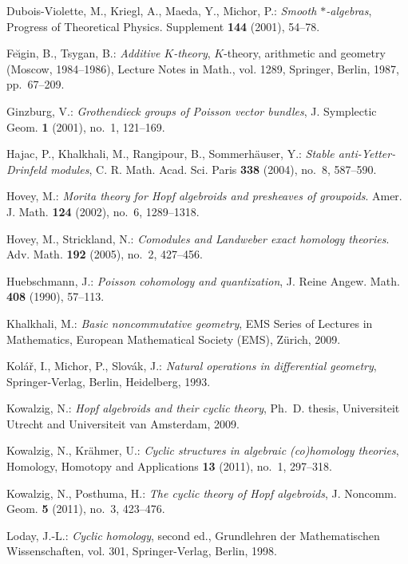\documentclass[reqno, a4paper, 10pt]{amsart}
\numberwithin{equation}{section}
\theoremstyle{plain}
\theoremstyle{definition}
\theoremstyle{remark}
\begin{document}
\begin{thebibliography}{10}
Dubois-Violette, M., Kriegl, A., Maeda, Y., Michor, P.: \emph{Smooth $*$-algebras},  Progress of Theoretical Physics. Supplement  \textbf{144} (2001), 54--78.

Fe{\u\i}gin, B., Tsygan, B.: \emph{Additive {$K$}-theory},
  $K$-theory, arithmetic and geometry (Moscow, 1984--1986), Lecture Notes in
  Math., vol. 1289, Springer, Berlin, 1987, pp.~67--209.

Ginzburg, V.: \emph{Grothendieck groups of {P}oisson vector bundles}, J.
  Symplectic Geom. \textbf{1} (2001), no.~1, 121--169.

Hajac, P., Khalkhali, M., Rangipour, B., Sommerh{\"a}user, Y.: 
\emph{Stable anti-{Y}etter-{D}rinfeld modules}, C. R. Math. Acad. Sci.
  Paris \textbf{338} (2004), no.~8, 587--590.

Hovey, M.: \emph{Morita theory for Hopf algebroids and presheaves of groupoids}. Amer. J. Math. \textbf{124} (2002), no.~6, 1289--1318.

Hovey, M., Strickland, N.: \emph{Comodules and Landweber exact homology theories}. Adv. Math. \textbf{192} (2005), no.~2, 427--456.

Huebschmann, J.: \emph{Poisson cohomology and quantization}, J. Reine
  Angew. Math. \textbf{408} (1990), 57--113.

Khalkhali, M.: \emph{Basic noncommutative geometry}, EMS Series of Lectures
  in Mathematics, European Mathematical Society (EMS), Z\"urich, 2009.

Kol\'a\v{r}, I., Michor, P., Slov\'ak, J.: \emph{Natural operations in differential geometry}, Springer-Verlag, Berlin, Heidelberg, 1993.

Kowalzig, N.: \emph{Hopf algebroids and their cyclic theory}, Ph.~D. thesis,
  Universiteit Utrecht and Universiteit van Amsterdam, 2009.

Kowalzig, N., Kr{\"a}hmer, U.: \emph{Cyclic structures in algebraic
  (co)homology theories}, Homology, Homotopy and Applications {\bf 13}
  (2011), no.~1, 297--318.

Kowalzig, N., Posthuma, H.: \emph{The cyclic theory of {H}opf
  algebroids},  J. Noncomm. Geom. \textbf{5} (2011), no.~3, 423--476.

Loday, J.-L.: \emph{Cyclic homology}, second ed., Grundlehren der
  Mathematischen Wissenschaften, vol. 301, Springer-Verlag, Berlin, 1998.


\end{thebibliography}
\end{document}
